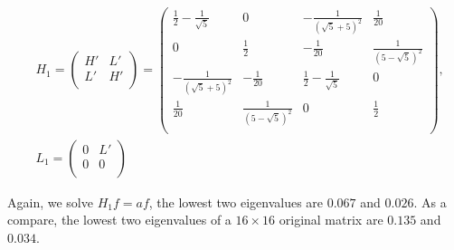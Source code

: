 \begin{equation}
\begin{split}
&H_1=\begin{pmatrix}
H' & L' \\
L' & H' \\
\end{pmatrix}=\left(
    \begin{array}{cccc}
     \frac{1}{2}-\frac{1}{\sqrt{5}} & 0 & -\frac{1}{\left(\sqrt{5}+5\right)^2} & \frac{1}{20} \\
     0 & \frac{1}{2} & -\frac{1}{20} & \frac{1}{\left(5-\sqrt{5}\right)^2} \\
     -\frac{1}{\left(\sqrt{5}+5\right)^2} & -\frac{1}{20} & \frac{1}{2}-\frac{1}{\sqrt{5}} & 0 \\
     \frac{1}{20} & \frac{1}{\left(5-\sqrt{5}\right)^2} & 0 & \frac{1}{2} \\
    \end{array}
    \right),\\
&L_1=\begin{pmatrix}
0 & L' \\
0 & 0 \\
\end{pmatrix}
\end{split}
\end{equation}  

Again, we solve $H_1f=af$, the lowest two eigenvalues are $0.067$ and $0.026$. As a compare, the lowest two eigenvalues of a $16\times 16$ original matrix are $0.135$ and $0.034$.

